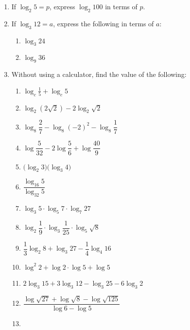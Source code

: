 \documentclass[12pt]{report}
\begin{document}
\begin{multicols}{2}
\begin{enumerate}
        \item If $\log_2 5 = p$, express $\log_2 100$ in terms of $p$.
        \item If $\log_3 12 = a$, express the following in terms of $a$:
              \begin{enumerate}
                  \item $\log_3 24$
                  \item $\log_9 36$
              \end{enumerate}

        \item Without using a calculator, find the value of the following:
              \begin{enumerate}
                  \item $\log_{c}{\frac{1}{5}}+\log_{c}5$
                  \item $\log_{2}\left(2{\sqrt{2}}\right)-2\log_{2}{\sqrt{2}}$
                  \item $\log_8{\dfrac{2}{7}}-\log_{8}(-2)^{2}-\log_{8}{\dfrac{1}{7}}$
                  \item $\log{\dfrac{5}{32}}-2\log{\dfrac{5}{6}}+\log{\dfrac{40}{9}}$
                  \item ${\big(}\log_{2}3{\big)}{\big(}\log_{3}4{\big)}$
                  \item $\dfrac{\log_{16}5}{\log_{32}5}$
                  \item $\log_{3}5\cdot\log_{5}7\cdot\log_{7}27$
                  \item $\log_{2}{\dfrac{1}{9}}\cdot\log_{3}{\dfrac{1}{25}}\cdot\log_{5}\sqrt8$
                  \item $\dfrac{1}{3}\log_{2}8+\log_{3}27-\dfrac{1}{4}\log_{4}16$
                  \item $\log^{2}2+\log2\cdot\log5+\log5$
                  \item $2\log_{3}15+3\log_{3}12-\log_{3}25-6\log_{3}2$
                  \item ${\dfrac{\log{\sqrt{27}}+\log{\sqrt{8}}-\log{\sqrt{125}}}{\log6-\log5}}$
                  \item {}
              \end{enumerate}


\end{enumerate}
\end{multicols}
\end{document}
